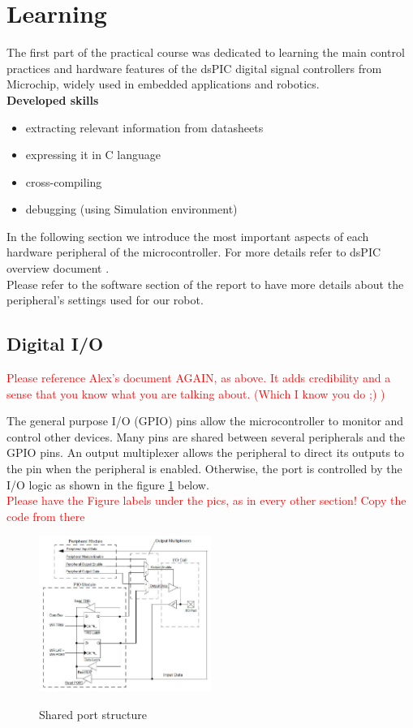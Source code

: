 \section{Learning}
\noindent
The first part of the practical course was dedicated to learning the main control practices and hardware features of the dsPIC digital signal controllers from Microchip, widely used in embedded applications and robotics.\\

\noindent
\textbf{Developed skills}
\begin{itemize}
    \item extracting relevant information from datasheets
    \item expressing it in C language
    \item cross-compiling
    \item debugging (using Simulation environment)
\end{itemize}

\noindent
In the following section we introduce the most important aspects of each hardware peripheral of the microcontroller. For more details refer to dsPIC overview document \cite{alex}.\\
Please refer to the software section of the report to have more details about the peripheral’s settings used for our robot.

\subsection{Digital I/O}

\textcolor{red}{Please reference Alex's document AGAIN, as above. It adds credibility and a sense that you know what you are talking about. (Which I know you do ;) )}

The general purpose I/O (GPIO) pins allow the microcontroller to monitor and control other devices. Many pins are shared between several peripherals and the GPIO pins. An output multiplexer allows the peripheral to direct its outputs to the pin when the peripheral is enabled. Otherwise, the port is controlled by the I/O logic as shown in the figure \ref{fig:gpio} below.\\

\textcolor{red}{Please have the Figure labels under the pics, as in every other section! Copy the code from there}

\begin{figure}[H]
    \caption{Shared port structure \cite{alex}}
        \centering
            \includegraphics[width=0.5\textwidth]{figures/software/GPIO.PNG}
            \label{fig:gpio}
\end{figure}

